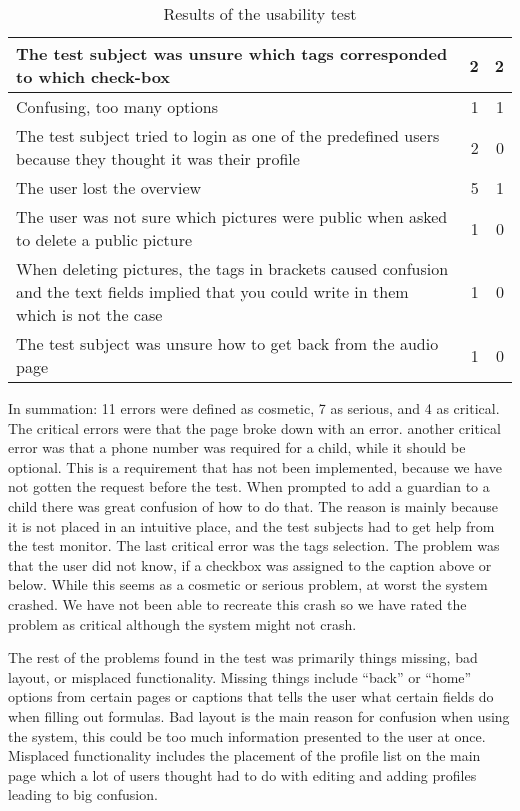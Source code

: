 \begin{table}[H]
\begin{tabular}{|p{7cm}|r|r|}
		The test subject was unsure which tags corresponded to which check-box & 2 & 2 \\ \hline
		Confusing, too many options & 1 & 1 \\ \hline
		The test subject tried to login as one of the predefined users because they thought it was their profile & 2 & 0 \\ \hline
		The user lost the overview & 5 & 1 \\ \hline
		The user was not sure which pictures were public when asked to delete a public picture & 1 & 0 \\ \hline
		When deleting pictures, the tags in brackets caused confusion and the text fields implied that you could write in them which is not the case & 1 & 0 \\ \hline
		The test subject was unsure how to get back from the audio page & 1 & 0 \\
		\hline
	\end{tabular}
	\caption{Results of the usability test}
	\label{tab:results}
\end{table}

In summation: 11 errors were defined as cosmetic, 7 as serious, and 4 as critical. \\

The critical errors were that the page broke down with an error. another critical error was that a phone number was required for a child, while it should be optional.
This is a requirement that has not been implemented, because we have not gotten the request before the test.
When prompted to add a guardian to a child there was great confusion of how to do that.
The reason is mainly because it is not placed in an intuitive place, and the test subjects had to get help from the test monitor.
The last critical error was the tags selection. The problem was that the user did not know, if a checkbox was assigned to the caption above or below. While this seems as a cosmetic or serious problem, at worst the system crashed. We have not been able to recreate this crash so we have rated the problem as critical although the system might not crash.

The rest of the problems found in the test was primarily things missing, bad layout, or misplaced functionality.
Missing things include ``back'' or ``home'' options from certain pages or captions that tells the user what certain fields do when filling out formulas. Bad layout is the main reason for confusion when using the system, this could be too much information presented to the user at once.
Misplaced functionality includes the placement of the profile list on the main page which a lot of users thought had to do with editing and adding profiles leading to big confusion. 